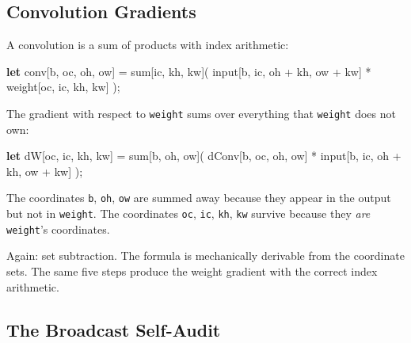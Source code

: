 \documentclass[11pt,titlepage]{article}
\newenvironment{Shaded}{}{}
\newcommand{\KeywordTok}[1]{\textcolor[rgb]{0.00,0.44,0.13}{\textbf{#1}}}
\newcommand{\NormalTok}[1]{#1}
\newcommand{\OperatorTok}[1]{\textcolor[rgb]{0.40,0.40,0.40}{#1}}
\begin{document}
\vspace{2em}

\hypertarget{convolution-gradients}{%
\subsection{Convolution Gradients}\label{convolution-gradients}}

A convolution is a sum of products with index arithmetic:

\begin{Shaded}
\begin{Highlighting}[]
\KeywordTok{let}\NormalTok{ conv}\OperatorTok{[}\NormalTok{b, oc, oh, ow}\OperatorTok{]}\NormalTok{ = sum}\OperatorTok{[}\NormalTok{ic, kh, kw}\OperatorTok{]}\NormalTok{(}
\NormalTok{    input}\OperatorTok{[}\NormalTok{b, ic, oh + kh, ow + kw}\OperatorTok{]}\NormalTok{ * weight}\OperatorTok{[}\NormalTok{oc, ic, kh, kw}\OperatorTok{]}
\NormalTok{);}
\end{Highlighting}
\end{Shaded}

The gradient with respect to \texttt{weight} sums over everything that
\texttt{weight} does not own:

\begin{Shaded}
\begin{Highlighting}[]
\KeywordTok{let}\NormalTok{ dW}\OperatorTok{[}\NormalTok{oc, ic, kh, kw}\OperatorTok{]}\NormalTok{ = sum}\OperatorTok{[}\NormalTok{b, oh, ow}\OperatorTok{]}\NormalTok{(}
\NormalTok{    dConv}\OperatorTok{[}\NormalTok{b, oc, oh, ow}\OperatorTok{]}\NormalTok{ * input}\OperatorTok{[}\NormalTok{b, ic, oh + kh, ow + kw}\OperatorTok{]}
\NormalTok{);}
\end{Highlighting}
\end{Shaded}

The coordinates \texttt{b}, \texttt{oh}, \texttt{ow} are summed away
because they appear in the output but not in \texttt{weight}. The
coordinates \texttt{oc}, \texttt{ic}, \texttt{kh}, \texttt{kw} survive
because they \emph{are} \texttt{weight}'s coordinates.

Again: set subtraction. The formula is mechanically derivable from the
coordinate sets. The same five steps produce the weight gradient with
the correct index arithmetic.

\vspace{2em}

\hypertarget{the-broadcast-self-audit}{%
\subsection{The Broadcast Self-Audit}\label{the-broadcast-self-audit}}
\end{document}
